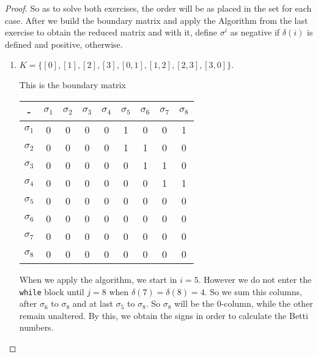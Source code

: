 \begin{proof}

So as to solve both exercises, the order will be as placed in the set for each
case.
After we build the boundary matrix and apply the Algorithm from the last
exercise to obtain the reduced matrix and with it, define $\sigma^i$ as negative
if $\delta(i)$ is defined and positive, otherwise. 

\begin{enumerate}
    \item    $K = \{[0], [1], [2], [3], [0, 1], [1, 2], [2, 3], [3, 0]\}.$
    
    This is the boundary matrix

    \begin{center}
        \begin{tabular}{|c|c|c|c|c|c|c|c|c|}
        \hline
        -          & $\sigma_1$ & $\sigma_2$ & $\sigma_3$ & $\sigma_4$ & $\sigma_5$ & $\sigma_6$ & $\sigma_7$ & $\sigma_8$ \\ \hline
        $\sigma_1$ & 0          & 0          & 0          & 0          & 1          & 0          & 0          & 1          \\ \hline
        $\sigma_2$ & 0          & 0          & 0          & 0          & 1          & 1          & 0          & 0          \\ \hline
        $\sigma_3$ & 0          & 0          & 0          & 0          & 0          & 1          & 1          & 0          \\ \hline
        $\sigma_4$ & 0          & 0          & 0          & 0          & 0          & 0          & 1          & 1          \\ \hline
        $\sigma_5$ & 0          & 0          & 0          & 0          & 0          & 0          & 0          & 0          \\ \hline
        $\sigma_6$ & 0          & 0          & 0          & 0          & 0          & 0          & 0          & 0          \\ \hline
        $\sigma_7$ & 0          & 0          & 0          & 0          & 0          & 0          & 0          & 0          \\ \hline
        $\sigma_8$ & 0          & 0          & 0          & 0          & 0          & 0          & 0          & 0          \\ \hline
        \end{tabular}
    \end{center}

    When we apply the algorithm, we start in $i = 5$. However we do not enter
    the \texttt{while} block until $j = 8$ when $\delta(7) =
    \delta(8) = 4$. So we sum this columns, after $\sigma_6$ to $\sigma_8$ and
    at last $\sigma_5$ to $\sigma_8$. So $\sigma_8$ will be the 0-column,
    while the other remain unaltered. By this, we obtain the signs in order
    to calculate the Betti numbers. 


\end{enumerate}
\end{proof}
